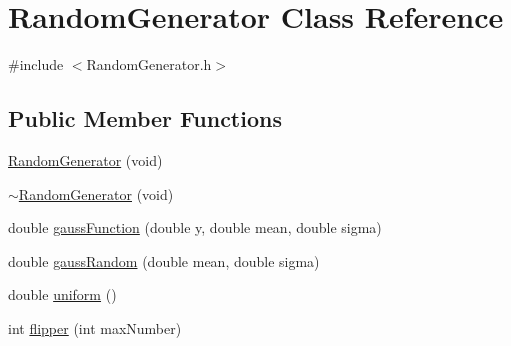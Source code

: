 \hypertarget{class_random_generator}{\section{Random\+Generator Class Reference}
\label{class_random_generator}
}


{\ttfamily \#include $<$Random\+Generator.\+h$>$}

\subsection*{Public Member Functions}
\begin{DoxyCompactItemize}
\item 
\hyperlink{class_random_generator_ad68dfb1d3d6164777c27beb1d5869873}{Random\+Generator} (void)
\item 
\hyperlink{class_random_generator_ada0252d5def711284f6b381a3aa85b6e}{$\sim$\+Random\+Generator} (void)
\item 
double \hyperlink{class_random_generator_a354e78930c8d4dd84dee041d8b5e3e2d}{gauss\+Function} (double y, double mean, double sigma)
\item 
double \hyperlink{class_random_generator_a89a28448defc23c508267db51bee1ba0}{gauss\+Random} (double mean, double sigma)
\item 
double \hyperlink{class_random_generator_a466cd9a5f2aba42f297fcd65b5ee2de9}{uniform} ()
\item 
int \hyperlink{class_random_generator_aeacd03768fb03aba8fbc34b1966ffbb2}{flipper} (int max\+Number)
\end{DoxyCompactItemize}


